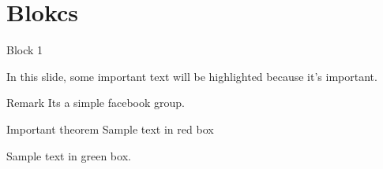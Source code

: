 \section{Blokcs}

\begin{frame}{Block 1}

In this slide, some important text will be
\alert{highlighted} because it's important.

\begin{block}{Remark}
Its a simple facebook group.
\end{block}

\begin{alertblock}{Important theorem}
Sample text in red box
\end{alertblock}

\begin{examples}
Sample text in green box. 
\end{examples}
\end{frame}